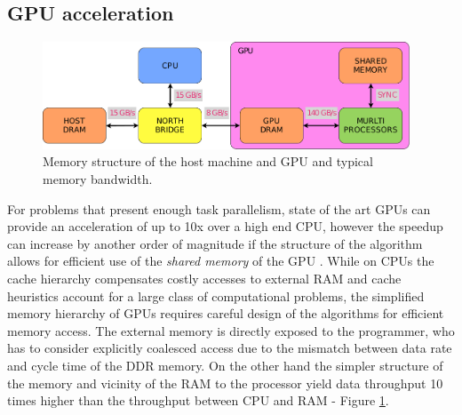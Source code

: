 \documentclass[12pt,a4paper]{report}
\begin{document}
\subsection{GPU acceleration}
\begin{figure}[h]
\centering
\includegraphics[width=4.3in]{gpu_6}
\caption{Memory structure of the host machine and GPU and typical memory bandwidth.}
\label{fig:hardware}
\end{figure}

For problems that present enough task parallelism, state of the art GPUs can provide an acceleration of up to 10x over a high end CPU, 
however the speedup can increase by another order of magnitude if the structure of the algorithm allows for efficient 
use of the \textit{shared memory} of the GPU \cite{stone_2007, ufimtsev_2008, pedemonte_2009}.  
While on CPUs the cache hierarchy compensates costly accesses to external RAM 
and cache heuristics account for a large class of computational problems, the simplified memory hierarchy 
of GPUs requires careful design of the algorithms for efficient memory access. The external memory is directly exposed to the programmer, 
who has to consider explicitly coalesced access due to the mismatch between data rate and cycle time of the DDR memory. On the other hand 
the simpler structure of the memory and vicinity of the RAM to the processor yield data throughput 10 times higher than the 
throughput between CPU and RAM - Figure \ref{fig:hardware}. \\
\end{document}
